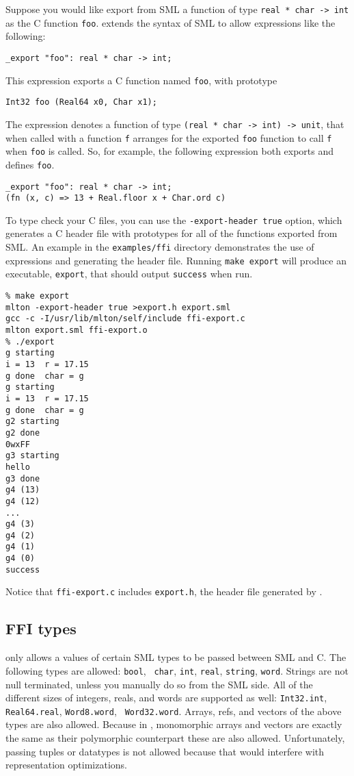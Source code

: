 Suppose you would like export from SML a function of type {\tt real *
char -> int} as the C function {\tt foo}.  {\mlton} extends the syntax
of SML to allow expressions like the following:
\begin{verbatim}
_export "foo": real * char -> int;
\end{verbatim}
This expression exports a C function named {\tt foo}, with prototype
\begin{verbatim}
Int32 foo (Real64 x0, Char x1);
\end{verbatim}
The {\export} expression denotes a function of type {\tt (real * char
-> int) -> unit}, that when called with a function {\tt f} arranges
for the exported {\tt foo} function to call {\tt f} when {\tt foo} is
called.  So, for example, the following expression both exports and
defines {\tt foo}.
\begin{verbatim}
_export "foo": real * char -> int;
(fn (x, c) => 13 + Real.floor x + Char.ord c)
\end{verbatim}

To type check your C files, you can use the {\tt -export-header true}
option, which generates a C header file with prototypes for all of the
functions exported from SML.  An example in the {\tt examples/ffi}
directory demonstrates the use of {\export} expressions and generating
the header file.  Running {\tt make export} will produce an
executable, {\tt export}, that should output {\tt success} when run.

\begin{verbatim}
% make export
mlton -export-header true >export.h export.sml
gcc -c -I/usr/lib/mlton/self/include ffi-export.c
mlton export.sml ffi-export.o
% ./export
g starting
i = 13  r = 17.15
g done  char = g
g starting
i = 13  r = 17.15
g done  char = g
g2 starting
g2 done
0wxFF
g3 starting
hello
g3 done
g4 (13)
g4 (12)
...
g4 (3)
g4 (2)
g4 (1)
g4 (0)
success
\end{verbatim}

Notice that {\tt ffi-export.c} includes {\tt export.h}, the header
file generated by {\mlton}.

\subsection{FFI types}

{\mlton} only allows a values of certain SML types to be passed
between SML and C.  The following types are allowed: {\tt bool}, {\tt
char}, {\tt int}, {\tt real}, {\tt string}, {\tt word}.  Strings are
not null terminated, unless you manually do so from the SML side.  All
of the different sizes of integers, reals, and words are supported as
well: {\tt Int32.int}, {\tt Real64.real}, {\tt Word8.word}, {\tt
Word32.word}.  Arrays, refs, and vectors of the above types are also
allowed.  Because in {\mlton}, monomorphic arrays and vectors are
exactly the same as their polymorphic counterpart these are also
allowed.  Unfortunately, passing tuples or datatypes is not allowed
because that would interfere with representation optimizations.

